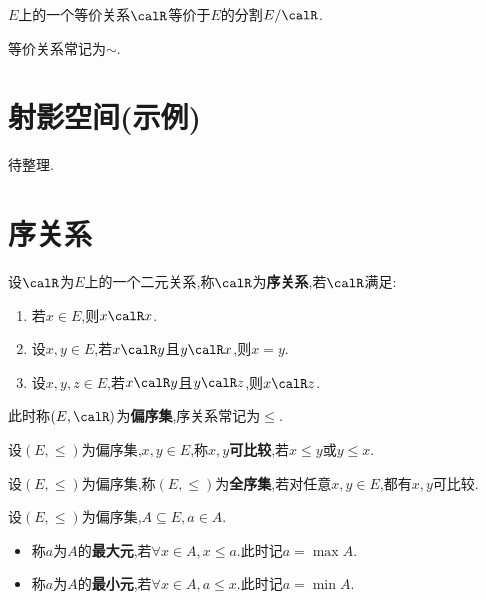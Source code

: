 \begin{rqq}
    $E$上的一个等价关系$\calR$等价于$E$的分割$E / \calR$.
\end{rqq}

\begin{rqq}
    等价关系常记为$\sim$.
\end{rqq}

\section{射影空间(示例)}

待整理.

\section{序关系}

\begin{deff}
    设$\calR$为$E$上的一个二元关系,称$\calR$为\textbf{序关系},若$\calR$满足:
    \begin{enumerate}
        \item 若$x \in E$,则$x \calR x$.
        \item 设$x, y \in E$,若$x \calR y$且$y \calR x$,则$x = y$.
        \item 设$x, y, z \in E$,若$x \calR y$且$y \calR z$,则$x \calR z$.
    \end{enumerate}
    此时称$(E, \calR)$为\textbf{偏序集},序关系常记为$\leqslant$.
\end{deff}

\begin{deff}
    设$(E, \leqslant)$为偏序集,$x, y \in E$,称$x, y$\textbf{可比较},若$x \leqslant y$或$y \leqslant x$.
\end{deff}

\begin{deff}
    设$(E, \leqslant)$为偏序集,称$(E, \leqslant)$为\textbf{全序集},若对任意$x, y \in E$,都有$x, y$可比较.
\end{deff}

\begin{deff}
    设$(E, \leqslant)$为偏序集,$A \subseteq E, a \in A$.
    \begin{itemize}
        \item 称$a$为$A$的\textbf{最大元},若$\forall x \in A, x \leqslant a$.此时记$a = \max A$.
        \item 称$a$为$A$的\textbf{最小元},若$\forall x \in A, a \leqslant x$.此时记$a = \min A$.
    \end{itemize}
\end{deff}

